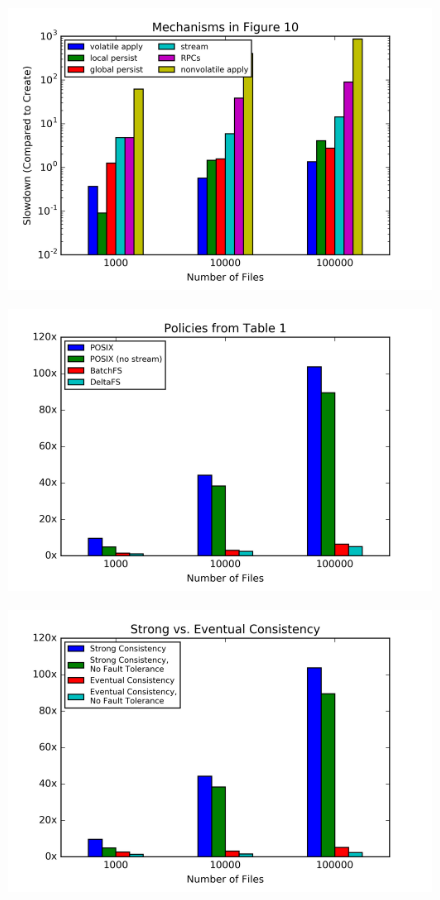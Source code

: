 \begin{figure}[tb]
\centering
\includegraphics[width=1.0\linewidth]{graphs/slowdown-mechanisms.png}
\caption{}
\end{figure}
\begin{figure}[tb]
\centering
\includegraphics[width=1.0\linewidth]{graphs/slowdown-related-work.png}
\caption{}
\end{figure}
\begin{figure}[tb]
\centering
\includegraphics[width=1.0\linewidth]{graphs/slowdown-strong-v-eventual.png}
\caption{}
\end{figure}

